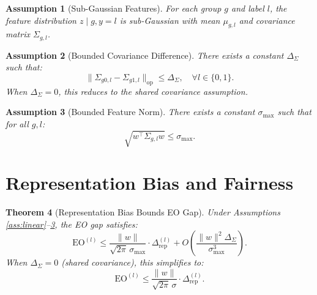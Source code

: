 \documentclass[11pt]{article}
\newtheorem{theorem}{Theorem}
\newtheorem{assumption}[theorem]{Assumption}
\begin{document}
\begin{assumption}[Sub-Gaussian Features]
    \label{ass:subgaussian}
    For each group $g$ and label $l$, the feature distribution $z \mid g, y=l$ is sub-Gaussian with mean $\mu_{g,l}$ and covariance matrix $\Sigma_{g,l}$.
\end{assumption}

\begin{assumption}[Bounded Covariance Difference]
    \label{ass:bounded_cov}
    There exists a constant $\Delta_\Sigma$ such that:
    \begin{equation}
        \|\Sigma_{g0,l} - \Sigma_{g1,l}\|_{\mathrm{op}} \leq \Delta_\Sigma, \quad \forall l \in \{0,1\}.
    \end{equation}
    When $\Delta_\Sigma = 0$, this reduces to the shared covariance assumption.
\end{assumption}

\begin{assumption}[Bounded Feature Norm]
    \label{ass:bounded_norm}
    There exists a constant $\sigma_{\max}$ such that for all $g, l$:
    \begin{equation}
        \sqrt{w^\top \Sigma_{g,l} w} \leq \sigma_{\max}.
    \end{equation}
\end{assumption}


\section{Representation Bias and Fairness}

\begin{theorem}[Representation Bias Bounds EO Gap]
    \label{thm:rep_eo}
    Under Assumptions \ref{ass:linear}--\ref{ass:bounded_norm}, the EO gap satisfies:
    \begin{equation}
        \mathrm{EO}^{(l)} \leq \frac{\|w\|}{\sqrt{2\pi}\,\sigma_{\max}} \cdot \Delta_{\mathrm{rep}}^{(l)} + O\!\left(\frac{\|w\|^2 \Delta_\Sigma}{\sigma_{\max}^3}\right).
    \end{equation}
    When $\Delta_\Sigma = 0$ (shared covariance), this simplifies to:
    \begin{equation}
        \mathrm{EO}^{(l)} \leq \frac{\|w\|}{\sqrt{2\pi}\,\sigma} \cdot \Delta_{\mathrm{rep}}^{(l)}.
    \end{equation}
\end{theorem}
\end{document}
